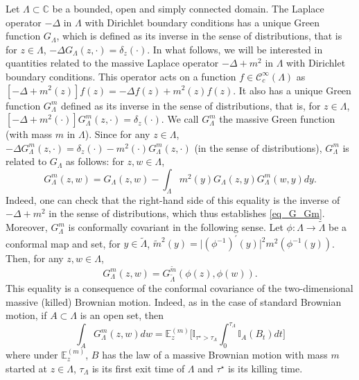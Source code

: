 \documentclass{article}
\newcommand{\EE}{{\mathbb{E}}}
\theoremstyle{definition}
\theoremstyle{remark}
\theoremstyle{remark}
\begin{document}
Let $\Lambda \subset \mathbb{C}$ be a bounded, open and simply connected domain. The Laplace operator $-\Delta$ in $\Lambda$ with Dirichlet boundary conditions has a unique Green function $G_{\Lambda}$, which is defined as its inverse in the sense of distributions, that is for $z \in \Lambda$, $-\Delta G_{\Lambda}(z,\cdot) = \delta_z(\cdot)$. In what follows, we will be interested in quantities related to the massive Laplace operator $-\Delta +m^2$ in $\Lambda$ with Dirichlet boundary conditions. This operator acts on a function $f \in \mathcal{C}_c^{\infty}(\Lambda)$ as $[-\Delta + m^2(z)]f(z) = -\Delta f(z) + m^2(z)f(z)$. It also has a unique Green function $G_{\Lambda}^m$ defined as its inverse in the sense of distributions, that is, for $z \in \Lambda$, $[-\Delta + m^2(\cdot)]G_{\Lambda}^m(z,\cdot) = \delta_z(\cdot)$. We call $G_{\Lambda}^m$ the massive Green function (with mass $m$ in $\Lambda$). Since for any $z \in \Lambda$, $-\Delta G_{\Lambda}^m(z, \cdot) = \delta_z(\cdot) - m^2(\cdot)G_{\Lambda}^m(z, \cdot)$ (in the sense of distributions), $G_{\Lambda}^{m}$ is related to $G_{\Lambda}$ as follows: for $z, w \in \Lambda$,
\begin{equation} \label{eq_G_Gm}
    G_{\Lambda}^{m}(z,w) = G_{\Lambda}(z,w) - \int_{\Lambda} m^{2}(y) G_{\Lambda}(z,y)G_{\Lambda}^{m}(w,y) dy.
\end{equation}
Indeed, one can check that the right-hand side of this equality is the inverse of $-\Delta + m^2$ in the sense of distributions, which thus establishes \eqref{eq_G_Gm}. Moreover, $G_{\Lambda}^m$ is conformally covariant in the following sense. Let $\phi: \Lambda \to \tilde \Lambda$ be a conformal map and set, for $y \in \tilde \Lambda$, $\tilde m^2(y) = \vert (\phi^{-1})^{'}(y) \vert^2 m^2(\phi^{-1}(y))$. Then, for any $z,w \in \Lambda$,
\begin{equation} \label{cov_Green}
    G_{\Lambda}^m(z,w) = G_{\tilde \Lambda}^{\tilde m}(\phi(z),\phi(w)).
\end{equation}
This equality is a consequence of the conformal covariance of the two-dimensional massive (killed) Brownian motion. Indeed, as in the case of standard Brownian motion, if $A \subset \Lambda$ is an open set, then
\begin{equation*}
    \int_{A} G_{\Lambda}^m(z,w) dw = \EE_{z}^{(m)}\bigg[ \mathbb{I}_{\tau^{\star} > \tau_{\Lambda}} \int_{0}^{\tau_{\Lambda}} \mathbb{I}_{A}(B_t) dt \bigg]
\end{equation*}
where under $\EE_z^{(m)}$, $B$ has the law of a massive Brownian motion with mass $m$ started at $z \in \Lambda$, $\tau_{\Lambda}$ is its first exit time of $\Lambda$ and $\tau^{\star}$ is its killing time.
\end{document}
